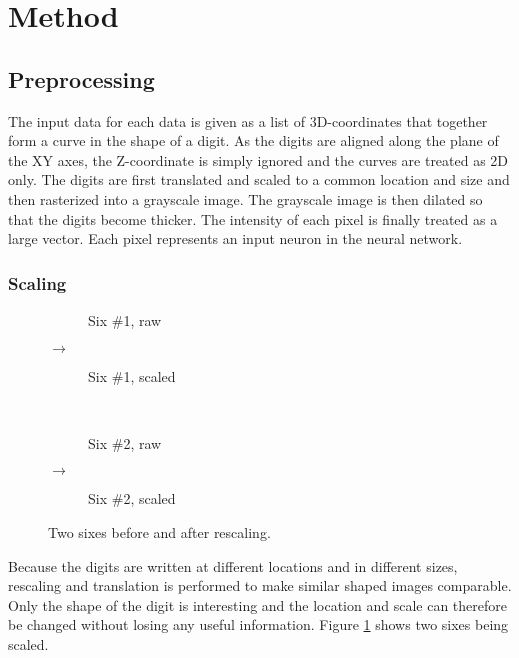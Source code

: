 \documentclass[report.tex]{subfile}
\begin{document}
\section{Method}

\subsection{Preprocessing}
The input data for each data is given as a list of 3D-coordinates that together
form a curve in the shape of a digit. As the digits are aligned along the plane
of the XY axes, the Z-coordinate is simply ignored and the curves are treated
as 2D only. The digits are first translated and scaled to a common location and
size and then rasterized into a grayscale image. The grayscale image is then
dilated so that the digits become thicker. The intensity of each pixel is
finally treated as a large vector. Each pixel represents an input neuron in the
neural network.

\subsubsection{Scaling}
\begin{figure}
    \centering
    \begin{subfigure}[c]{0.3\textwidth}
        \resizebox{\textwidth}{!}{}
        \caption{Six \#1, raw}
    \end{subfigure}%
    {\Huge $\rightarrow$}
    \begin{subfigure}[c]{0.3\textwidth}
        \resizebox{\textwidth}{!}{}
        \caption{Six \#1, scaled}
    \end{subfigure}\\
    \begin{subfigure}[c]{0.3\textwidth}
        \resizebox{\textwidth}{!}{}
        \caption{Six \#2, raw}
    \end{subfigure}%
    {\Huge $\rightarrow$}
    \begin{subfigure}[c]{0.3\textwidth}
        \resizebox{\textwidth}{!}{}
        \caption{Six \#2, scaled}
    \end{subfigure}
    \caption{Two sixes before and after rescaling.}
    \label{fig:scaling}
\end{figure}
Because the digits are written at different locations and in different sizes,
rescaling and translation is performed to make similar shaped images
comparable. Only the shape of the digit is interesting and the location and
scale can therefore be changed without losing any useful information. Figure
\ref{fig:scaling} shows two sixes being scaled.
\end{document}
